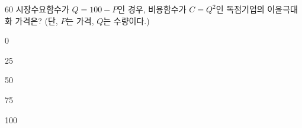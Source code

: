 \begin{question}{60}
시장수요함수가 $Q = 100 - P$인 경우, 비용함수가 $C = Q^2$인 독점기업의 이윤극대화 가격은? (단, $P$는 가격, $Q$는 수량이다.)
\begin{choices}
  \item 0
  \item 25
  \item 50
  \item 75
  \item 100
\end{choices}
\end{question}

